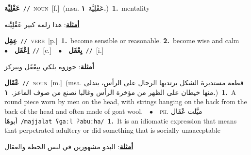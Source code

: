 \documentclass[10pt,a4paper,twoside]{article} %
\begin{document}
\begin{multicols}{2}
{\setlength\topsep{0pt}\textbf{\foreignlanguage{arabic}{عَقْلِيِّة}}\ {\color{gray}\texttt{//}\color{black}}\ \textsc{noun}\ [f.]\ \color{gray}(msa. \foreignlanguage{arabic}{عَقْلِيَّة}~\foreignlanguage{arabic}{\textbf{١.}})\color{black}\ \textbf{1.}~mentality\  \begin{flushright}\color{gray}\foreignlanguage{arabic}{\textbf{\underline{\foreignlanguage{arabic}{أمثلة}}}: هذا زلمة كبير عَقْلِيِّته}\end{flushright}\color{black}} \vspace{2mm}

{\setlength\topsep{0pt}\textbf{\foreignlanguage{arabic}{عِقِل}}\ {\color{gray}\texttt{//}\color{black}}\ \textsc{verb}\ [p.]\ \textbf{1.}~become sensible or reasonable.  \textbf{2.}~become wise and calm\ \ $\bullet$\ \ \setlength\topsep{0pt}\textbf{\foreignlanguage{arabic}{اِعْقَل}}\ {\color{gray}\texttt{//}\color{black}}\ [c.]\ \ $\bullet$\ \ \setlength\topsep{0pt}\textbf{\foreignlanguage{arabic}{يِعْقَل}}\ {\color{gray}\texttt{//}\color{black}}\ [i.]\  \begin{flushright}\color{gray}\foreignlanguage{arabic}{\textbf{\underline{\foreignlanguage{arabic}{أمثلة}}}: جوزوه بلكي بيِعْقَل وبيركز}\end{flushright}\color{black}} \vspace{2mm}

{\setlength\topsep{0pt}\textbf{\foreignlanguage{arabic}{عْقَال}}\ {\color{gray}\texttt{//}\color{black}}\ \textsc{noun}\ [m.]\ \color{gray}(msa. \foreignlanguage{arabic}{قطعة مستديرة الشكل يرتديها الرجال على الرأس، يتدلى منها خيطان على الظهر من مؤخرة الرأس وغالبا تصنع من صوف الماعز.}~\foreignlanguage{arabic}{\textbf{١.}})\color{black}\ \textbf{1.}~A round piece worn by men on the head, with strings hanging on the back from the back of the head and often made of goat wool.\ \ $\bullet$\ \ \textsc{ph.} \color{gray} \foreignlanguage{arabic}{ميَّلت عْقَال أبوهَا}\color{black}\ {\color{gray}\texttt{/{\sffamily majjalat ʕɡaːl ʔabuːha}/}\color{black}}\ \textbf{1.}~It is an idiomatic expression that means that perpetrated adultery or did something that is socially unaaceptable\  \begin{flushright}\color{gray}\foreignlanguage{arabic}{\textbf{\underline{\foreignlanguage{arabic}{أمثلة}}}: البدو مشهورين في لبس الحطة والعقال}\end{flushright}\color{black}} \vspace{2mm}


\end{multicols}
\end{document}
